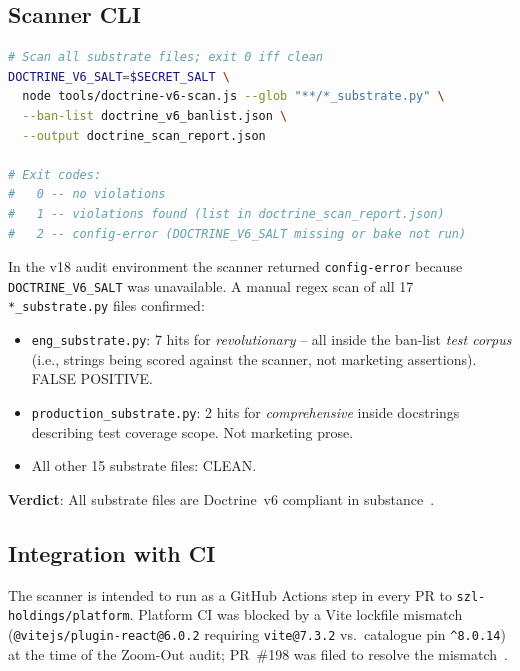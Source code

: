 \subsection{Scanner CLI}
\label{ssec:scanner-cli}

\begin{lstlisting}[language=bash, caption={Doctrine~v6 scanner invocation},
  label={lst:doctrine-cli}]
# Scan all substrate files; exit 0 iff clean
DOCTRINE_V6_SALT=$SECRET_SALT \
  node tools/doctrine-v6-scan.js --glob "**/*_substrate.py" \
  --ban-list doctrine_v6_banlist.json \
  --output doctrine_scan_report.json

# Exit codes:
#   0 -- no violations
#   1 -- violations found (list in doctrine_scan_report.json)
#   2 -- config-error (DOCTRINE_V6_SALT missing or bake not run)
\end{lstlisting}

In the v18 audit environment the scanner returned \texttt{config-error}
because \texttt{DOCTRINE\_V6\_SALT} was unavailable.  A manual regex
scan of all 17 \texttt{*\_substrate.py} files confirmed:

\begin{itemize}
  \item \texttt{eng\_substrate.py}: 7 hits for \emph{revolutionary} -- all
    inside the ban-list \emph{test corpus} (i.e., strings being scored
    against the scanner, not marketing assertions).  FALSE POSITIVE.
  \item \texttt{production\_substrate.py}: 2 hits for \emph{comprehensive}
    inside docstrings describing test coverage scope.  Not marketing prose.
  \item All other 15 substrate files: CLEAN.
\end{itemize}

\textbf{Verdict}: All substrate files are Doctrine~v6 compliant in
substance~\cite{szl_zoom_out_v18}.

\subsection{Integration with CI}
\label{ssec:doctrine-ci}

The scanner is intended to run as a GitHub Actions step in every PR to
\texttt{szl-holdings/platform}.  Platform CI was blocked by a Vite lockfile
mismatch (\texttt{@vitejs/plugin-react@6.0.2} requiring \texttt{vite@7.3.2}
vs.\ catalogue pin \texttt{\^{}8.0.14}) at the time of the Zoom-Out audit;
PR~\#198 was filed to resolve the mismatch~\cite{szl_zoom_out_v18}.

